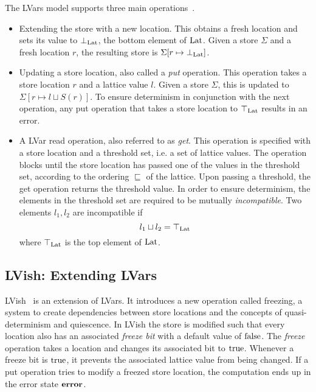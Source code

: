 The LVars model supports three main operations~\parencite{kuper2013lvars}.
\begin{itemize}
  \item Extending the store with a new location. This obtains a fresh location
    and
    sets its value to $\bot_{\mathrm{Lat}}$, the bottom element of $\mathrm{Lat}$.
    Given a store $\Sigma$ and a fresh location $r$, the resulting store is
    $\Sigma[r \mapsto \bot_{\mathrm{Lat}}]$.
  \item Updating a store location, also called a \emph{put} operation. This
    operation takes a store location $r$ and a lattice value $l$. Given a store
    $\Sigma$, this is updated to $\Sigma[r \mapsto l\sqcup S(r)]$. To ensure determinism in
    conjunction with the next operation, any put operation that takes a store
    location to $\top_{\mathrm{Lat}}$ results in an error.
  \item A LVar read operation, also referred to as \emph{get}. This operation is
    specified with a store location and a threshold set, i.e. a set of lattice
    values. The operation blocks until the store location has passed one of the
    values in the threshold set, according to the ordering $\sqsubseteq$ of the
    lattice. Upon passing a threshold, the get operation returns the threshold
    value. In order to ensure determinism, the elements in the threshold set are
    required to be mutually \emph{incompatible}. Two elements $l_1, l_2$ are
    incompatible if
    \begin{equation*}
      l_1 \sqcup l_2 = \top_{\mathrm{Lat}}
    \end{equation*}
    where $\top_{\mathrm{Lat}}$ is the top element of $\mathrm{Lat}$.
\end{itemize}

\subsection{LVish: Extending LVars}%
\label{sub:lvish_extending_lvars}

LVish~\parencite{kuper2014freeze} is an extension of LVars. It introduces a new
operation called freezing, a system to create dependencies between store
locations and the concepts of quasi-determinism and quiescence.  In LVish the
store is modified such that every location also has an associated \emph{freeze
bit} with a default value of $\mathrm{false}$. The \emph{freeze} operation
takes a location and changes its associated bit to $\mathrm{true}$.  Whenever a
freeze bit is $\mathrm{true}$, it prevents the associated lattice value from being
changed. If a put operation tries to modify a freezed store location, the
computation ends up in the error state $\mbox{{\bf error}}$.

